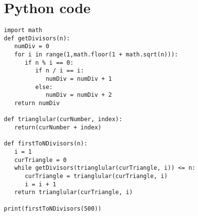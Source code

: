 \documentclass{article}
\begin{document}
\section*{Python code}
\begin{verbatim}
import math
def getDivisors(n):
   numDiv = 0
   for i in range(1,math.floor(1 + math.sqrt(n))):
      if n % i == 0:
         if n / i == i:
            numDiv = numDiv + 1
         else:
            numDiv = numDiv + 2
   return numDiv

def trianglular(curNumber, index):
   return(curNumber + index)

def firstToNDivisors(n):
   i = 1
   curTriangle = 0
   while getDivisors(trianglular(curTriangle, i)) <= n:
      curTriangle = trianglular(curTriangle, i)
      i = i + 1
   return trianglular(curTriangle, i)

print(firstToNDivisors(500))
\end{verbatim}
\end{document}

